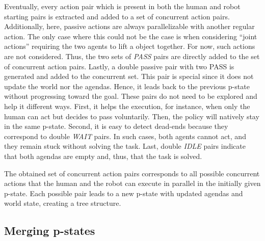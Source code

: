 Eventually, every action pair which is present in both the human and robot starting pairs is extracted and added to a set of concurrent action pairs. 
Additionally, here, passive actions are always parallelizable with another regular action. The only case where this could not be the case is when considering ``joint actions'' requiring the two agents to lift a object together. For now, such actions are not considered. Thus, the two sets of \textit{PASS} pairs are directly added to the set of concurrent action pairs. 
Lastly, a double passive pair with two PASS is generated and added to the concurrent set. This pair is special since it does not update the world nor the agendas. Hence, it leads back to the previous p-state without progressing toward the goal. These pairs do not need to be explored and help it different ways. First, it helps the execution, for instance, when only the human can act but decides to pass voluntarily. Then, the policy will natively stay in the same p-state. Second, it is easy to detect dead-ends because they correspond to double \textit{WAIT} pairs. In such cases, both agents cannot act, and they remain stuck without solving the task.  
Last, double \textit{IDLE} pairs indicate that both agendas are empty and, thus, that the task is solved. 

The obtained set of concurrent action pairs corresponds to all possible concurrent actions that the human and the robot can execute in parallel in the initially given p-state. Each possible pair leads to a new p-state with updated agendas and world state, creating a tree structure. 

    \subsection{Merging p-states}

